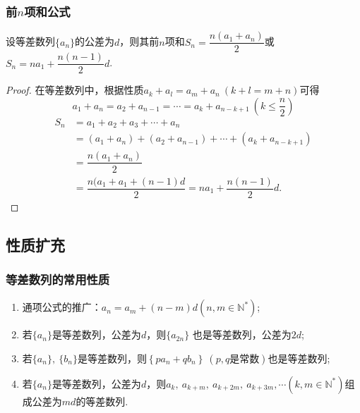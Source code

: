 \documentclass{BHCexam}
\begin{document}
\subsubsection{前$ n $项和公式}
设等差数列$\{a_n\}$的公差为$ d $，则其前$ n $项和$ S_n=\dfrac{n\left(a_1+a_n\right)}{2} $或$ S_n=na_1+\dfrac{n(n-1)}{2}d $.
\begin{proof}
在等差数列中，根据性质$ a_k+a_l=a_m+a_n~(k+l=m+n) $可得$$ a_1+a_n=a_2+a_{n-1}=\cdots=a_k+a_{n-k+1} ~\left(k\le\dfrac{n}{2}\right)$$
\begin{equation*}
\begin{aligned}
S_n&=a_1+a_2+a_3+\cdots+a_n\\
 &=\left(a_1+a_n\right)+\left(a_2+a_{n-1}\right)+\cdots+\left(a_k+a_{n-k+1}\right)\\
&=\dfrac{n(a_1+a_n)}{2}\\
&=\dfrac{n(a_1+a_1+(n-1)d}{2}=na_1+\dfrac{n(n-1)}{2}d.
\end{aligned}
\end{equation*}
\end{proof}
\subsection{性质扩充}
\subsubsection{等差数列的常用性质}
\begin{enumerate}[(1)]
\item 通项公式的推广：$ a_n=a_m+\left(n-m\right)d \left(n,m\in\mathbb{N^*}\right)$;
\item 若$\{a_n\}$是等差数列，公差为$ d $，则$\{a_{2n}\}$ 也是等差数列，公差为$ 2d $;
\item 若$\{a_n\},~\{b_n\}$是等差数列，则$ \left\{pa_n+qb_n\right\}~(p,q\text{是常数}) $也是等差数列;
\item 若$\{a_n\}$是等差数列，公差为$ d $，则$ a_k,~a_{k+m},~ a_{k+2m},~a_{k+3m},\cdots\left(k,m\in\mathbb{N^*}\right)$组成公差为$ md $的等差数列.
\end{enumerate}
\end{document}
